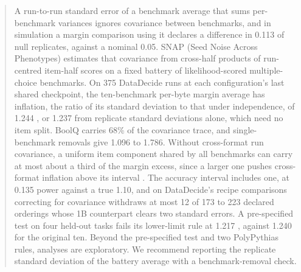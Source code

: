 \begin{abstract}
A run-to-run standard error of a benchmark average that sums per-benchmark variances ignores covariance between benchmarks, and in simulation a margin comparison using it declares a difference in 0.113 of null replicates, against a nominal 0.05. SNAP (Seed Noise Across Phenotypes) estimates that covariance from cross-half products of run-centred item-half scores on a fixed battery of likelihood-scored multiple-choice benchmarks. On 375 DataDecide runs at each configuration's last shared checkpoint, the ten-benchmark per-byte margin average has inflation, the ratio of its standard deviation to that under independence, of 1.244 , or 1.237  from replicate standard deviations alone, which need no item split. BoolQ carries 68\% of the covariance trace, and single-benchmark removals give 1.096 to 1.786. Without cross-format run covariance, a uniform item component shared by all benchmarks can carry at most about a third of the margin excess, since a larger one pushes cross-format inflation above its interval . The accuracy interval  includes one, at 0.135 power against a true 1.10, and on DataDecide's recipe comparisons correcting for covariance withdraws at most 12 of 173 to 223 declared orderings whose 1B counterpart clears two standard errors. A pre-specified test on four held-out tasks fails its lower-limit rule at 1.217 , against 1.240  for the original ten.  Beyond the pre-specified test and two PolyPythias rules, analyses are exploratory. We recommend reporting the replicate standard deviation of the battery average with a benchmark-removal check.
\end{abstract}

